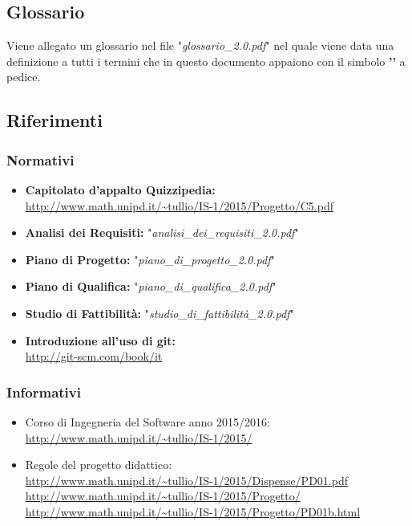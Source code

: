 \documentclass[a4paper,11pt]{article}
\begin{document}
		\subsection{Glossario}
			Viene allegato un glossario nel file "\textit{glossario\_2.0.pdf}" nel quale viene data una definizione a tutti i termini che in questo documento appaiono con il simbolo \textbf{'\addglos'}  a pedice.
		\subsection{Riferimenti}
			\subsubsection{Normativi}
				\begin{itemize}
					\item \textbf{Capitolato d'appalto Quizzipedia:}\\
					\url{http://www.math.unipd.it/~tullio/IS-1/2015/Progetto/C5.pdf}
					\item \textbf{Analisi dei Requisiti:} "\textit{analisi\_dei\_requisiti\_2.0.pdf}"
					\item \textbf{Piano di Progetto:} "\textit{piano\_di\_progetto\_2.0.pdf}"
					\item \textbf{Piano di Qualifica:} "\textit{piano\_di\_qualifica\_2.0.pdf}"
					\item \textbf{Studio di Fattibilità:} "\textit{studio\_di\_fattibilità\_2.0.pdf}"
					\item \textbf{Introduzione all'uso di git:} \\
					\url{http://git-scm.com/book/it} 
				\end{itemize}
			\subsubsection{Informativi}
				\begin{itemize}
					\item Corso di Ingegneria del Software anno 2015/2016:\\
					\url{http://www.math.unipd.it/~tullio/IS-1/2015/}
					\item Regole del progetto didattico:\\
					\url{http://www.math.unipd.it/~tullio/IS-1/2015/Dispense/PD01.pdf}
					\url{http://www.math.unipd.it/~tullio/IS-1/2015/Progetto/}\\
					\url{http://www.math.unipd.it/~tullio/IS-1/2015/Progetto/PD01b.html}
				\end{itemize}
	
\end{document}
